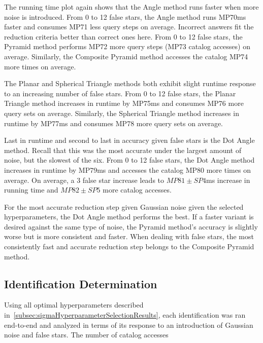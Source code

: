 The running time plot again shows that the Angle method runs faster when more noise is introduced.
From 0 to 12 false stars, the Angle method runs MP70ms faster and consumes MP71 less query steps on average.
Incorrect answers fit the reduction criteria better than correct ones here.
From 0 to 12 false stars, the Pyramid method performs MP72 more query steps (MP73 catalog accesses) on average.
Similarly, the Composite Pyramid method accesses the catalog MP74 more times on average.

The Planar and Spherical Triangle methods both exhibit slight runtime response to an increasing number of false
stars.
From 0 to 12 false stars, the Planar Triangle method increases in runtime by MP75ms and consumes MP76 more query sets
on average.
Similarly, the Spherical Triangle method increases in runtime by MP77ms and consumes MP78 more query sets on average.

Last in runtime and second to last in accuracy given false stars is the Dot Angle method.
Recall that this was the most accurate under the largest amount of noise, but the slowest of the six.
From 0 to 12 false stars, the Dot Angle method increases in runtime by MP79ms and accesses the catalog MP80 more times
on average.
On average, a 3 false star increase leads to $MP81 \pm SP4$ms increase in running time and $MP82 \pm SP5$ more
catalog accesses.

For the most accurate reduction step given Gaussian noise given the selected hyperparameters, the Dot Angle method
performs the best.
If a faster variant is desired against the same type of noise, the Pyramid method's accuracy is slightly worse but
is more consistent and faster.
When dealing with false stars, the most consistently fast and accurate reduction step belongs to the Composite Pyramid
method.

\subsection{Identification Determination}\label{subsec:identificationDeterminationResults}
Using all optimal hyperparameters described in~\autoref{subsec:sigmaHyperparameterSelectionResults}, each identification
was ran end-to-end and analyzed in terms of its response to an introduction of Gaussian noise and false stars.
The number of catalog accesses

